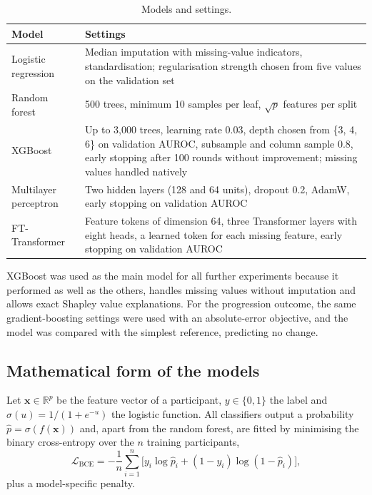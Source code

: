 \begin{table}[H]
\centering\small
\caption{Models and settings.}
\label{tab:models}
\begin{tabularx}{\textwidth}{@{}lY@{}}
\toprule
Model & Settings \\
\midrule
Logistic regression & Median imputation with missing-value indicators, standardisation; regularisation strength chosen from five values on the validation set \\
Random forest & 500 trees, minimum 10 samples per leaf, $\sqrt{p}$ features per split \\
XGBoost & Up to 3,000 trees, learning rate 0.03, depth chosen from \{3, 4, 6\} on validation AUROC, subsample and column sample 0.8, early stopping after 100 rounds without improvement; missing values handled natively \\
Multilayer perceptron & Two hidden layers (128 and 64 units), dropout 0.2, AdamW, early stopping on validation AUROC \\
FT-Transformer & Feature tokens of dimension 64, three Transformer layers with eight heads, a learned token for each missing feature, early stopping on validation AUROC \\
\bottomrule
\end{tabularx}
\end{table}

XGBoost was used as the main model for all further experiments because it performed as well as the others, handles missing values without imputation and allows exact Shapley value explanations. For the progression outcome, the same gradient-boosting settings were used with an absolute-error objective, and the model was compared with the simplest reference, predicting no change.

\subsection{Mathematical form of the models}
\label{sec:model_maths}

Let $\mathbf{x} \in \mathbb{R}^{p}$ be the feature vector of a participant, $y \in \{0,1\}$ the label and $\sigma(u) = 1/(1+e^{-u})$ the logistic function. All classifiers output a probability $\hat{p} = \sigma(f(\mathbf{x}))$ and, apart from the random forest, are fitted by minimising the binary cross-entropy over the $n$ training participants,
\begin{equation}
\mathcal{L}_{\text{BCE}} = -\frac{1}{n} \sum_{i=1}^{n} \Big[ y_i \log \hat{p}_i + (1 - y_i) \log (1 - \hat{p}_i) \Big],
\label{eq:bce}
\end{equation}
plus a model-specific penalty.

